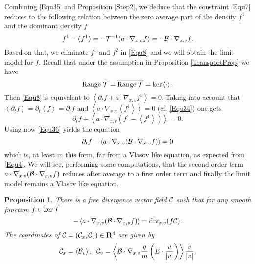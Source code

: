 \documentclass[12pt, a4paper]{article}
\providecommand\mathbb{\bf}
\newcommand\R{{\mathbb R}}
\newtheorem{pro}{Proposition}[section]
\newcommand{\fo}[0]{
f ^1}
\newcommand{\Divxv}[0]{
\mathrm{div}_{x,v}}
\newcommand{\ran}[0]{
\mathrm{Range\;}}
\newcommand{\nxv}[0]{
\nabla_{x,v}}
\newcommand{\ave}[1]{
\left \langle #1 \right \rangle }
\begin{document}
Combining \eqref{Equ35} and Proposition \ref{Step2}, we deduce that the constraint \eqref{Equ7} reduces to the following relation between the zero average part of the density $\fo$ and the dominant density $f$
\begin{equation}
\label{Equ36}
\fo - \ave{\fo} = - {\cal T} ^{-1} ( a \cdot \nxv f) = - {\cal B} \cdot \nxv f.
\end{equation}
Based on that, we eliminate $\fo$ and $f^2$ in \eqref{Equ8} and we will obtain the limit model for $f$. Recall that under the assumption in Proposition \ref{TransportProp} we have
\[
\ran {\cal T} = \overline{\ran {\cal T}} = \ker \ave{\cdot}.
\]
Then \eqref{Equ8} is equivalent to $\ave{\partial _t f + a \cdot \nxv \fo } = 0$. Taking into account that $\ave{\partial _t f} = \partial _t \ave{f} = \partial _t f $ and $\ave{ a \cdot \nxv \ave{\fo}} = 0$ (cf. \eqref{Equ34}) one gets
\[
\partial _t f + \ave{ a \cdot \nxv ( \fo - \ave{\fo}) } = 0.
\]
Using now \eqref{Equ36} yields the equation
\begin{equation}
\label{Equ37} \partial _t f - \ave{ a \cdot \nxv ( {\cal B} \cdot \nxv f ) } = 0
\end{equation}
which is, at least in this form, far from a Vlasov like equation, as expected from \eqref{Equ4}. We will see, performing some computations, that the second order term $a \cdot \nxv ( {\cal B} \cdot \nxv f )$ reduces after average to a first order term and finally the limit model remains a Vlasov like equation.
\begin{pro}
\label{Step3}
There is a free divergence vector field ${\cal C}$ such that for any smooth function $f \in \ker {\cal T}$
\[
- \ave{a \cdot \nxv ( {\cal B} \cdot \nxv f)} = \Divxv ( f {\cal C}).
\]
The coordinates of ${\cal C} = ({\cal C}_x, {\cal C}_v) \in \R^4$ are given by
\[
{\cal C}_x = \ave{{\cal B}_v},\;\;{\cal C}_v = \ave{{\cal B} \cdot \nxv \frac{q}{m} \left ( E \cdot \frac{v}{|v|} \right ) } \frac{v}{|v|}.
\]
\end{pro}
\end{document}
